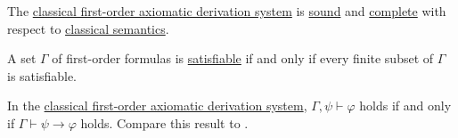\begin{theorem}\label{thm:classical_first_order_logic_is_sound_and_complete}
  The \hyperref[def:first_order_derivation_system]{classical first-order axiomatic derivation system} is \hyperref[def:derivability_and_satisfiability/soundness]{sound} and \hyperref[def:derivability_and_satisfiability/completeness]{complete} with respect to \hyperref[def:first_order_semantics]{classical semantics}.
\end{theorem}

\smallskip

\begin{corollary}\label{thm:first_order_compactness_theorem}
  A set \( \Gamma \) of first-order formulas is \hyperref[def:propositional_semantics/satisfiability]{satisfiable} if and only if every finite subset of \( \Gamma \) is satisfiable.
\end{corollary}

\begin{theorem}\label{thm:syntactic_deduction_theorem}
  In the \hyperref[def:first_order_derivation_system]{classical first-order axiomatic derivation system}, \( \Gamma, \psi \vdash \varphi \) holds if and only if \( \Gamma \vdash \psi \rightarrow \varphi \) holds. Compare this result to .
\end{theorem}
